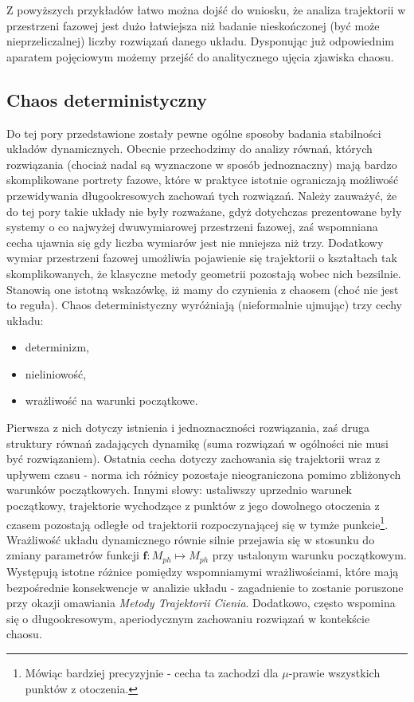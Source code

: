 \documentclass[12pt]{article}
\begin{document}
Z powyższych przykładów łatwo można dojść do wniosku, że analiza trajektorii w przestrzeni fazowej jest dużo łatwiejsza niż badanie nieskończonej (być może nieprzeliczalnej) liczby rozwiązań danego układu. Dysponując już odpowiednim aparatem pojęciowym możemy przejść do analitycznego ujęcia zjawiska chaosu.
\subsection{Chaos deterministyczny}
Do tej pory przedstawione zostały pewne ogólne sposoby badania stabilności układów dynamicznych. Obecnie przechodzimy do analizy równań, których rozwiązania (chociaż nadal są wyznaczone w sposób jednoznaczny) mają bardzo skomplikowane portrety fazowe, które w praktyce istotnie ograniczają możliwość przewidywania długookresowych zachowań tych rozwiązań. Należy zauważyć, że do tej pory takie układy nie były rozważane, gdyż dotychczas prezentowane były systemy o co najwyżej dwuwymiarowej przestrzeni fazowej, zaś wspomniana cecha ujawnia się gdy liczba wymiarów jest nie mniejsza niż trzy. Dodatkowy wymiar przestrzeni fazowej umożliwia pojawienie się trajektorii o kształtach tak skomplikowanych, że klasyczne metody geometrii pozostają wobec nich bezsilnie. Stanowią one istotną wskazówkę, iż mamy do czynienia z chaosem (choć nie jest to reguła). \newline
Chaos deterministyczny wyróżniają (nieformalnie ujmując) trzy cechy układu:
\begin{itemize}
	\item determinizm,
	\item nieliniowość,
	\item wrażliwość na warunki początkowe.
\end{itemize} 
Pierwsza z nich dotyczy istnienia i jednoznaczności rozwiązania, zaś druga struktury równań zadających dynamikę (suma rozwiązań w ogólności nie musi być rozwiązaniem). Ostatnia cecha dotyczy zachowania się trajektorii wraz z upływem czasu - norma ich różnicy pozostaje nieograniczona pomimo zbliżonych warunków początkowych. Innymi słowy: ustaliwszy uprzednio warunek początkowy, trajektorie wychodzące z punktów z jego dowolnego otoczenia z czasem pozostają odległe od trajektorii rozpoczynającej się w tymże punkcie\footnote{Mówiąc bardziej precyzyjnie - cecha ta zachodzi dla $ \mu $-prawie wszystkich punktów z otoczenia.}. Wrażliwość układu dynamicznego równie silnie przejawia się w stosunku do zmiany parametrów funkcji  $ \textbf{f}:M_{ph} \mapsto M_{ph}  $ przy ustalonym warunku początkowym. Występują istotne różnice pomiędzy wspomniamymi wrażliwościami, które mają bezpośrednie konsekwencje w analizie układu - zagadnienie to zostanie poruszone przy okazji omawiania \textit{Metody Trajektorii Cienia}. Dodatkowo, często wspomina się o długookresowym, aperiodycznym zachowaniu rozwiązań w kontekście chaosu. \newline
\end{document}
